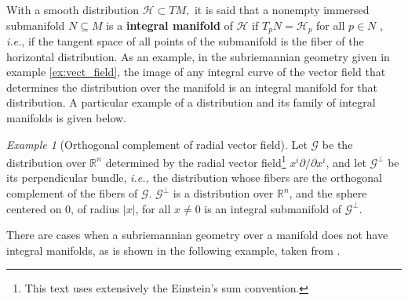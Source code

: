\documentclass[12pt, letterpaper, reqno]{amsart}
\theoremstyle{definition}
\theoremstyle{plain}
\theoremstyle{remark}
\newtheorem{ex}{Example}
\begin{document}
With a smooth distribution $ \mathcal{H} \subset TM, $ it is said that a nonempty immersed submanifold $ N\subseteq M $  is a \textbf{integral manifold} of $\mathcal{H}$ if $ T_p N = \mathcal{H}_p $ for all $ p\in N $ , \textit{i.e.}, if the tangent space of all points of the submanifold is the fiber of the horizontal distribution. As an example, in the subriemannian geometry given in example \ref{ex:vect_field}, the image of any integral curve of the vector field that determines the distribution over the manifold is an integral manifold for that distribution. A particular example of a distribution and its family of integral manifolds is given below.

\begin{ex}[Orthogonal complement of radial vector field]
	Let $ \mathcal{G} $ be the distribution over $ \mathbb{R}^n $ determined by the radial vector field\footnote{This text uses extensively the Einstein's sum convention.} $ x^i \partial / \partial x^i $, and let $ \mathcal{G}^\perp $ be its perpendicular bundle, \textit{i.e.,} the distribution whose fibers are the orthogonal complement of the fibers of $ \mathcal{G}. $ $ \mathcal{G}^\perp $ is a distribution over $ \mathbb{R}^n  $, and the sphere centered on $0$, of radius $ |x| $, for all $ x\neq0 $ is an integral submanifold of $ \mathcal{G}^\perp. $        
\end{ex}

There are cases when a subriemannian geometry over a manifold does not have integral manifolds, as is shown in the following example, taken from \cite{lee2018introduction}.

\nocite{*}

\end{document}
